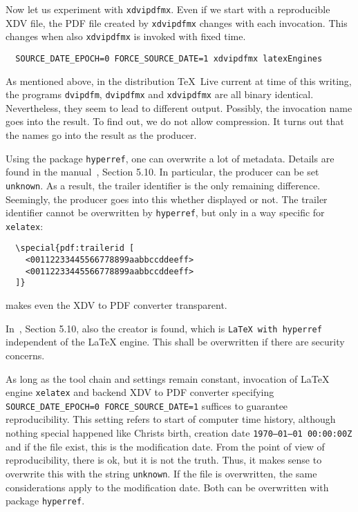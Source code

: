\documentclass[a4paper, english]{article}%
\newcommand{\xelatex}{\texttt{xelatex}}
\newcommand{\texlive}{\TeX~Live}
\begin{document}
Now let us experiment with \texttt{xdvipdfmx}. 
Even if we start with a reproducible XDV file, 
the PDF file created by \texttt{xdvipdfmx} 
changes with each invocation. 
This changes when also \texttt{xdvipdfmx} is invoked with fixed time. 
%
\begin{verbatim}
  SOURCE_DATE_EPOCH=0 FORCE_SOURCE_DATE=1 xdvipdfmx latexEngines
\end{verbatim}

As mentioned above, in the distribution \texlive{} current at time of this writing, 
the programs \texttt{dvipdfm}, \texttt{dvipdfmx} and \texttt{xdvipdfmx} 
are all binary identical. 
Nevertheless, they seem to lead to different output. 
Possibly, the invocation name goes into the result. 
To find out, we do not allow compression. 
It turns out that the names go into the result as the producer. 

Using the package \texttt{hyperref}, 
one can overwrite a lot of metadata. 
Details are found in the manual~\cite{HyperTextP}, Section 5.10. 
In particular, the producer can be set \texttt{unknown}. 
As a result, the trailer identifier is the only remaining difference. 
Seemingly, the producer goes into this whether displayed or not. 
The trailer identifier cannot be overwritten by \texttt{hyperref}, 
but only in a way specific for \xelatex: 
%
\begin{verbatim}
  \special{pdf:trailerid [
    <00112233445566778899aabbccddeeff>
    <00112233445566778899aabbccddeeff>
  ]}  
\end{verbatim}
%
makes even the XDV to PDF converter transparent. 

In~\cite{HyperTextP}, Section 5.10, also the creator is found, 
which is \texttt{LaTeX with hyperref} independent of the \LaTeX{} engine. 
This shall be overwritten if there are security concerns. 

As long as the tool chain and settings remain constant, 
invocation of \LaTeX{} engine \xelatex{} and backend XDV to PDF converter 
specifying \texttt{SOURCE\_DATE\_EPOCH=0 FORCE\_SOURCE\_DATE=1} 
suffices to guarantee reproducibility. 
This setting refers to start of computer time history, 
although nothing special happened like Christs birth,
creation date \texttt{1970--01--01 00:00:00Z} 
and if the file exist, this is the modification date. 
From the point of view of reproducibility, 
there is ok, but it is not the truth. 
Thus, it makes sense to overwrite this with the string \texttt{unknown}. 
If the file is overwritten, the same considerations apply to the modification date. 
Both can be overwritten with package \texttt{hyperref}. 
\end{document}
